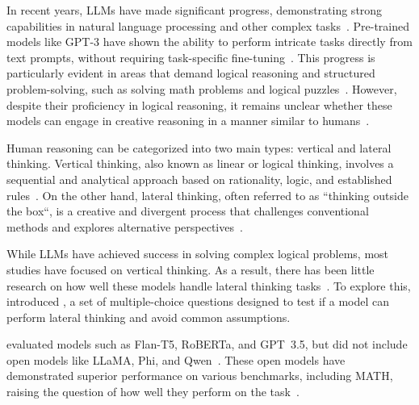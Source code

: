 In recent years, \acp{LLM} have made significant progress, demonstrating strong capabilities in natural language processing and other complex tasks~\cite{naveedComprehensiveOverviewLarge2024}. Pre-trained models like GPT-3 have shown the ability to perform intricate tasks directly from text prompts, without requiring task-specific fine-tuning~\cite{brownLanguageModelsAre2020}. This progress is particularly evident in areas that demand logical reasoning and structured problem-solving, such as solving math problems and logical puzzles~\cite{panLogicLMEmpoweringLarge2023,zebazeTreeProblemsImproving2024,yuFlowReasoningTraining2025}. However, despite their proficiency in logical reasoning, it remains unclear whether these models can engage in creative reasoning in a manner similar to humans~\cite{jiangBRAINTEASERLateralThinking2023}.

Human reasoning can be categorized into two main types: vertical and lateral thinking. Vertical thinking, also known as linear or logical thinking, involves a sequential and analytical approach based on rationality, logic, and established rules~\cite{jiangBRAINTEASERLateralThinking2023}. On the other hand, lateral thinking, often referred to as ``thinking outside the box``, is a creative and divergent process that challenges conventional methods and explores alternative perspectives~\cite{jiangBRAINTEASERLateralThinking2023}.

While \acp{LLM} have achieved success in solving complex logical problems, most studies have focused on vertical thinking. As a result, there has been little research on how well these models handle lateral thinking tasks~\cite{jiangBRAINTEASERLateralThinking2023,chenWeakevalStrongEvaluatingEliciting2024,huangLatEvalInteractiveLLMs2024}. To explore this, \textcite{jiangBRAINTEASERLateralThinking2023} introduced , a set of multiple-choice questions designed to test if a model can perform lateral thinking and avoid common assumptions.

\textcite{jiangBRAINTEASERLateralThinking2023} evaluated models such as Flan-T5, RoBERTa, and \acs{GPT}~3.5, but did not include open models like \acs{LLaMA}, \acs{Phi}, and \acs{Qwen}~\cite{jiangBRAINTEASERLateralThinking2023}. These open models have demonstrated superior performance on various benchmarks, including \ac{MATH}, raising the question of how well they perform on the  task~\cite{OpenLLMLeaderboard}.

